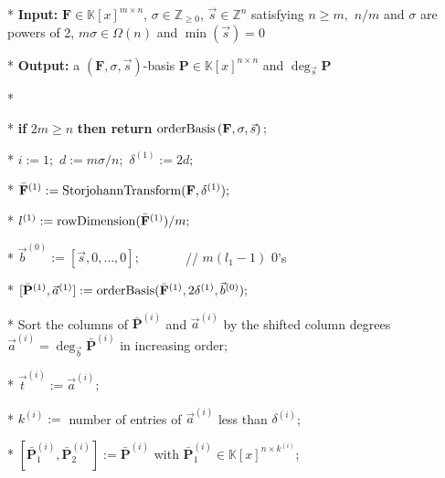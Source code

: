 \begin{algorithm}[t]
\caption{$\mmab\left(\mathbf{F},\sigma,\vec{s}\right)$ }


\label{alg:mab} 
\begin{algor}
\item [{{*}}] \textbf{Input:} $\mathbf{F}\in\mathbb{K}\left[x\right]^{m\times n}$,
$\sigma\in\mathbb{Z}_{\ge0}$, $\vec{s}\in\mathbb{Z}^{n}$ satisfying
$n\ge m,$ $n/m$ and $\sigma$ are powers of 2, $m\sigma\in\Omega(n)$
and $\min\left(\vec{s}\right)=0$ 
\item [{{*}}] \textbf{Output:} a $\left(\mathbf{F},\sigma,\vec{s}\right)$-basis
$\mathbf{P}\in\mathbb{K}\left[x\right]^{n\times n}$ and $\deg_{\vec{s}}\mathbf{P}$
\item [{{*}}]~\end{algor}
\begin{algor}[1]
\item [{{*}}] \textbf{if }$2m\ge n$ \textbf{then return} $\mab\left(\mathbf{F},\sigma,\vec{s}\right);$ 
\item [{{{*}}}] $i:=1;$ $d:=m\sigma/n;$ $\delta^{\left(1\right)}:=2d;$ 
\item [{{{*}}}] $\bar{\mathbf{F}}^{\left(1\right)}:=\StorjohannTransform(\mathbf{F},\delta^{\left(1\right)});$ 
\item [{{{*}}}] $l^{\left(1\right)}:=\rowDimension(\bar{\mathbf{F}}^{\left(1\right)})/m;$ 
\item [{{{*}}}] $\vec{b}^{\left(0\right)}:=\left[\vec{s},0,\dots,0\right];$\ \ \ \ \ \ \ //
$m(l_{1}-1)$ $0$'s
\item [{{{*}}}] $[\bar{\mathbf{P}}^{\left(1\right)},\vec{a}^{\left(1\right)}]:=\mab(\bar{\mathbf{F}}^{\left(1\right)},2\delta^{\left(1\right)},\vec{b}^{\left(0\right)});$ 
\item [{{{*}}}] Sort the columns of $\bar{\mathbf{P}}^{\left(i\right)}$
and $\vec{a}^{\left(i\right)}$ by the shifted column degrees $\vec{a}^{\left(i\right)}=\deg_{\vec{b}}\bar{\mathbf{P}}^{\left(i\right)}$
in increasing order; 
\item [{{*}}] $\vec{t}^{\left(i\right)}:=\vec{a}^{\left(i\right)};$ 
\item [{{{*}}}] $k^{\left(i\right)}:=$ number of entries of $\vec{a}^{\left(i\right)}$
less than $\delta^{\left(i\right)}$;
\item [{{*}}] $[\bar{\mathbf{P}}_{1}^{\left(i\right)},\bar{\mathbf{P}}_{2}^{\left(i\right)}]:=\bar{\mathbf{P}}^{\left(i\right)}$
with $\bar{\mathbf{P}}_{1}^{\left(i\right)}\in\mathbb{K}\left[x\right]^{n\times k^{\left(i\right)}}$;

\end{algor}
\end{algorithm}
